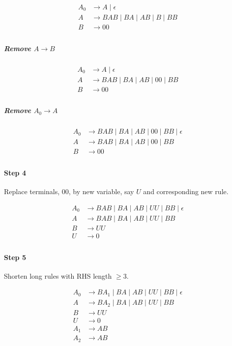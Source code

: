 \documentclass{article}
\begin{document}
\begin{align*}
	A_0 &\longrightarrow A \;|\; \epsilon \\
	A &\longrightarrow BAB \;|\; BA \;|\; AB \;|\; B \;|\; BB \\
	B &\longrightarrow 00 \\
\end{align*}

\subparagraph{Remove $A \longrightarrow B$}

\begin{align*}
	A_0 &\longrightarrow A \;|\; \epsilon \\
	A &\longrightarrow BAB \;|\; BA \;|\; AB \;|\; 00 \;|\; BB \\
	B &\longrightarrow 00 \\
\end{align*}

\subparagraph{Remove $A_0 \longrightarrow A$}

\begin{align*}
	A_0 &\longrightarrow BAB \;|\; BA \;|\; AB \;|\; 00 \;|\; BB \;|\; \epsilon \\
	A &\longrightarrow BAB \;|\; BA \;|\; AB \;|\; 00 \;|\; BB \\
	B &\longrightarrow 00 \\
\end{align*}

\paragraph{Step 4} Replace terminals, 00, by new variable, say $U$ and corresponding new rule.

\begin{align*}
	A_0 &\longrightarrow BAB \;|\; BA \;|\; AB \;|\; UU \;|\; BB \;|\; \epsilon \\
	A &\longrightarrow BAB \;|\; BA \;|\; AB \;|\; UU \;|\; BB \\
	B &\longrightarrow UU \\
	U &\longrightarrow 0 \\
\end{align*}

\paragraph{Step 5} Shorten long rules with RHS length $\geq 3$.

\begin{align*}
	A_0 &\longrightarrow BA_1 \;|\; BA \;|\; AB \;|\; UU \;|\; BB \;|\; \epsilon \\
	A &\longrightarrow BA_2 \;|\; BA \;|\; AB \;|\; UU \;|\; BB \\
	B &\longrightarrow UU \\
	U &\longrightarrow 0 \\
	A_1 &\longrightarrow AB \\
	A_2 &\longrightarrow AB \\
\end{align*}
\end{document}
